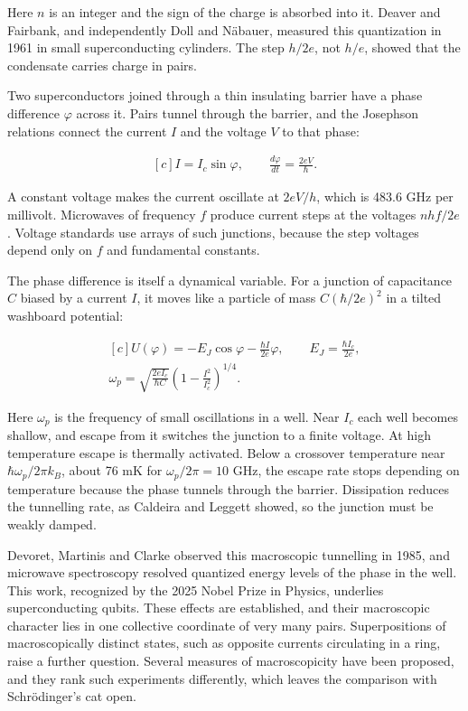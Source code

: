 \documentclass[11pt,oneside]{book}
\newenvironment{centeredalign}{\[\begin{gathered}[c]}{\end{gathered}\]}
\begin{document}
Here \(n\) is an integer and the sign of the charge is absorbed into it. Deaver and Fairbank, and independently Doll and Näbauer, measured this quantization in 1961 in small superconducting cylinders. The step \(h/2e\), not \(h/e\), showed that the condensate carries charge in pairs.

Two superconductors joined through a thin insulating barrier have a phase difference \(\varphi\) across it. Pairs tunnel through the barrier, and the Josephson relations connect the current \(I\) and the voltage \(V\) to that phase:

\begin{centeredalign}
I=I_c\sin\varphi,\qquad \frac{d\varphi}{dt}=\frac{2eV}{\hbar}.
\end{centeredalign}

A constant voltage makes the current oscillate at \(2eV/h\), which is 483.6 GHz per millivolt. Microwaves of frequency \(f\) produce current steps at the voltages \(nhf/2e\). Voltage standards use arrays of such junctions, because the step voltages depend only on \(f\) and fundamental constants.

The phase difference is itself a dynamical variable. For a junction of capacitance \(C\) biased by a current \(I\), it moves like a particle of mass \(C(\hbar/2e)^2\) in a tilted washboard potential:

\begin{centeredalign}
U(\varphi)=-E_J\cos\varphi-\frac{\hbar I}{2e}\varphi,\qquad E_J=\frac{\hbar I_c}{2e},\\
\omega_p=\sqrt{\frac{2eI_c}{\hbar C}}\left(1-\frac{I^2}{I_c^2}\right)^{1/4}.
\end{centeredalign}

Here \(\omega_p\) is the frequency of small oscillations in a well. Near \(I_c\) each well becomes shallow, and escape from it switches the junction to a finite voltage. At high temperature escape is thermally activated. Below a crossover temperature near \(\hbar\omega_p/2\pi k_B\), about 76 mK for \(\omega_p/2\pi=10\) GHz, the escape rate stops depending on temperature because the phase tunnels through the barrier. Dissipation reduces the tunnelling rate, as Caldeira and Leggett showed, so the junction must be weakly damped.

Devoret, Martinis and Clarke observed this macroscopic tunnelling in 1985, and microwave spectroscopy resolved quantized energy levels of the phase in the well. This work, recognized by the 2025 Nobel Prize in Physics, underlies superconducting qubits. These effects are established, and their macroscopic character lies in one collective coordinate of very many pairs. Superpositions of macroscopically distinct states, such as opposite currents circulating in a ring, raise a further question. Several measures of macroscopicity have been proposed, and they rank such experiments differently, which leaves the comparison with Schrödinger's cat open.
\end{document}
